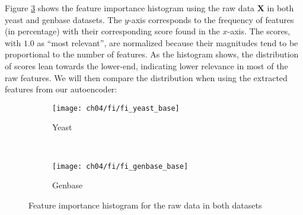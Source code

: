 \par Figure \ref{results:fi_base} shows the feature importance histogram using
the raw data $\mathbf{X}$ in both yeast and genbase datasets. The $y$-axis
corresponds to the frequency of features (in percentage) with their
corresponding score found in the $x$-axis. The scores, with $1.0$ as ``most
relevant'', are normalized because their magnitudes tend to be proportional to
the number of features. As the histogram shows, the distribution of scores lean
towards the lower-end, indicating lower relevance in most of the raw features.
We will then compare the distribution when using the extracted features from
our autoencoder:

\begin{figure}[t]
    \centering
    \begin{subfigure}[b]{0.45\textwidth}
        \texttt{[image: ch04/fi/fi\_yeast\_base]}
        \caption{Yeast}
        \label{results:fi_yeast_base}
    \end{subfigure}
    ~ %
    \begin{subfigure}[b]{0.45\textwidth}
        \texttt{[image: ch04/fi/fi\_genbase\_base]}
        \caption{Genbase}
        \label{results:fi_genbase_base}
    \end{subfigure}
    \caption{Feature importance histogram for the raw data in both datasets}
    \label{results:fi_base}
\end{figure}

